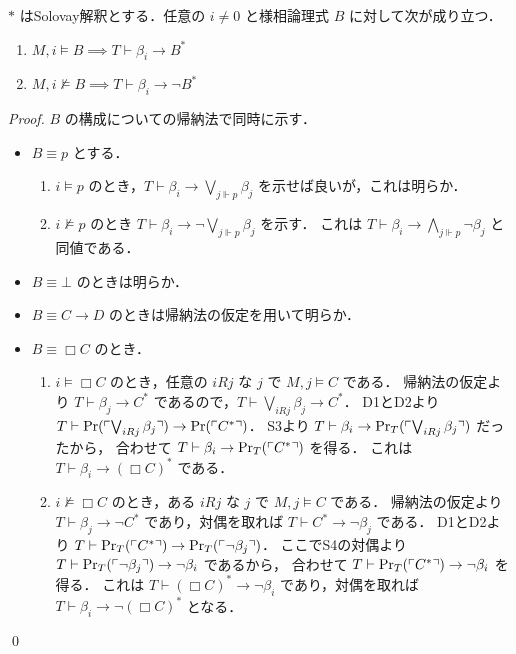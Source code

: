 \documentclass{jlreq}
\begin{document}
\begin{lemma}\label{lem:solovay_interpretation}
	$*$ はSolovay解釈とする．任意の $i \neq 0$ と様相論理式 $B$ に対して次が成り立つ．
	\begin{enumerate}
		\item $M, i \vDash B \implies T \vdash \beta_i \to B^*$
		\item $M, i \nvDash B \implies T \vdash \beta_i \to \lnot B^*$
	\end{enumerate}
\end{lemma}
\begin{proof}
	$B$ の構成についての帰納法で同時に示す．
	\begin{itemize}
		\item
		      $B \equiv p$ とする．
		      \begin{enumerate}
			      \item
			            $i \vDash p$ のとき，$T \vdash \beta_i \to \bigvee_{j \Vdash p} \beta_j $ を示せば良いが，これは明らか．
			      \item
			            $i \nvDash p$ のとき $T \vdash \beta_i \to \lnot \bigvee_{j \Vdash p} \beta_j$ を示す．
			            これは $T \vdash \beta_i \to \bigwedge_{j \Vdash p} \lnot \beta_j$ と同値である．
		      \end{enumerate}
		\item $B \equiv \bot$ のときは明らか．
		\item $B \equiv C \to D$ のときは帰納法の仮定を用いて明らか．
		\item
		      $B \equiv \Box C$ のとき．
		      \begin{enumerate}
			      \item
			            $i \vDash \Box C$ のとき，任意の $i R j$ な $j$ で $M, j \vDash C$ である．
			            帰納法の仮定より $T \vdash \beta_j \to C^*$ であるので，$T \vdash \bigvee_{i R j} \beta_j \to C^*$．
			            D1とD2より $T \vdash \mathrm{Pr}(\ulcorner \bigvee_{i R j} \beta_j \urcorner) \to \mathrm{Pr}(\ulcorner C^* \urcorner)$．
			            S3より $T \vdash \beta_i \to \mathrm{Pr}_T(\ulcorner \bigvee_{i R j} \beta_j \urcorner)$ だったから，
			            合わせて $T \vdash \beta_i \to \mathrm{Pr}_T(\ulcorner C^* \urcorner)$ を得る．
			            これは $T \vdash \beta_i \to (\Box C)^*$ である．
			      \item
			            $i \nvDash \Box C$ のとき，ある $i R j$ な $j$ で $M, j \vDash C$ である．
			            帰納法の仮定より $T \vdash \beta_j \to \lnot C^*$ であり，対偶を取れば $T \vdash C^* \to \lnot \beta_j$ である．
			            D1とD2より $T \vdash \mathrm{Pr}_T(\ulcorner C^* \urcorner) \to \mathrm{Pr}_T(\ulcorner \lnot \beta_j \urcorner)$．
			            ここでS4の対偶より $T \vdash \mathrm{Pr}_T(\ulcorner \lnot \beta_j \urcorner) \to \lnot \beta_i$ であるから，
			            合わせて $T \vdash \mathrm{Pr}_T(\ulcorner C^* \urcorner) \to \lnot \beta_i$ を得る．
			            これは $T \vdash (\Box C)^* \to \lnot \beta_i$ であり，対偶を取れば $T \vdash \beta_i \to \lnot (\Box C)^*$ となる．
		      \end{enumerate}
	\end{itemize}
	\qed
\end{proof}
\end{document}
